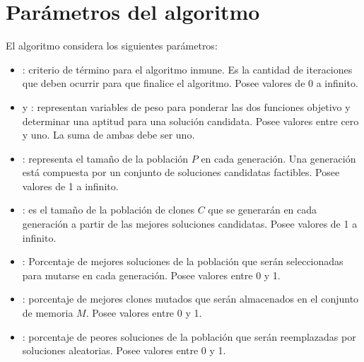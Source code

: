 \section{Parámetros del algoritmo}

El algoritmo considera los siguientes parámetros:

\begin{itemize}
\item \generaciones: criterio de término para el algoritmo inmune. Es la cantidad de iteraciones que deben ocurrir para que finalice el algoritmo. Posee valores de 0 a infinito.
\item \alp{ } y \bet: representan variables de peso para ponderar las dos funciones objetivo y determinar una aptitud para una solución candidata. Posee valores entre cero y uno. La suma de ambas debe ser uno.
\item \popsize: representa el tamaño de la población $P$ en cada generación. Una generación está compuesta por un conjunto de soluciones candidatas factibles. Posee valores de 1 a infinito.
\item \clonsize: es el tamaño de la población de clones $C$ que se generarán en cada generación a partir de las mejores soluciones candidatas. Posee valores de 1 a infinito.
\item \pmejores: Porcentaje de mejores soluciones de la población que serán seleccionadas para mutarse en cada generación. Posee valores entre 0 y 1.
\item \pclones: porcentaje de mejores clones mutados que serán almacenados en el conjunto de memoria $M$. Posee valores entre 0 y 1.
\item \preemplazo: porcentaje de peores soluciones de la población que serán reemplazadas por soluciones aleatorias. Posee valores entre 0 y 1.
\end{itemize}
